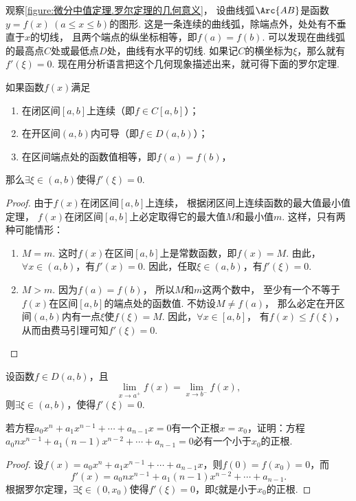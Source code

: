 观察\cref{figure:微分中值定理.罗尔定理的几何意义}，
设曲线弧\(\Arc{AB}\)是函数\(y=f(x)\ (a\leq x\leq b)\)的图形.
这是一条连续的曲线弧，除端点外，处处有不垂直于\(x\)的切线，
且两个端点的纵坐标相等，即\(f(a)=f(b)\).
可以发现在曲线弧的最高点\(C\)处或最低点\(D\)处，曲线有水平的切线.
如果记\(C\)的横坐标为\(\xi\)，那么就有\(f'(\xi)=0\).
现在用分析语言把这个几何现象描述出来，就可得下面的罗尔定理.

\begin{theorem}[罗尔定理]\label{theorem:微分中值定理.罗尔定理}
如果函数\(f(x)\)满足
\begin{enumerate}
	\item 在闭区间\([a,b]\)上连续（即\(f \in C[a,b]\)）；
	\item 在开区间\((a,b)\)内可导（即\(f \in D(a,b)\)）；
	\item 在区间端点处的函数值相等，即\(f(a)=f(b)\)，
\end{enumerate}
那么\(\exists \xi \in (a,b)\)使得\(f'(\xi) = 0\).
\begin{proof}
由于\(f(x)\)在闭区间\([a,b]\)上连续，
根据闭区间上连续函数的最大值最小值定理，
\(f(x)\)在闭区间\([a,b]\)上必定取得它的最大值\(M\)和最小值\(m\).
这样，只有两种可能情形：
\begin{enumerate}
	\item \(M=m\).
		这时\(f(x)\)在区间\([a,b]\)上是常数函数，即\(f(x)=M\).
		由此，\(\forall x\in(a,b)\)，有\(f'(x)=0\).
		因此，任取\(\xi\in(a,b)\)，有\(f'(\xi)=0\).

	\item \(M>m\).
		因为\(f(a)=f(b)\)，
		所以\(M\)和\(m\)这两个数中，
		至少有一个不等于\(f(x)\)在区间\([a,b]\)的端点处的函数值.
		不妨设\(M \neq f(a)\)，
		那么必定在开区间\((a,b)\)内有一点\(\xi\)使\(f(\xi)=M\).
		因此，\(\forall x\in[a,b]\)，
		有\(f(x) \leq f(\xi)\)，从而由费马引理可知\(f'(\xi)=0\).
		\qedhere
\end{enumerate}
\end{proof}
\end{theorem}

\begin{corollary}
设函数\(f \in D(a,b)\)，且\[
\lim_{x \to a^+} f(x)
= \lim_{x \to b^-} f(x),
\]则\(\exists\xi\in(a,b)\)，使得\(f'(\xi) = 0\).
\end{corollary}

\begin{example}
若方程\(a_0 x^n + a_1 x^{n-1} + \dotsb + a_{n-1} x = 0\)有一个正根\(x = x_0\)，证明：方程\(a_0 n x^{n-1} + a_1 (n-1) x^{n-2} + \dotsb + a_{n-1} = 0\)必有一个小于\(x_0\)的正根.
\begin{proof}
设\(f(x) = a_0 x^n + a_1 x^{n-1} + \dotsb + a_{n-1} x\)，则\(f(0) = f(x_0) = 0\)，而\[
f'(x) = a_0 n x^{n-1} + a_1 (n-1) x^{n-2} + \dotsb + a_{n-1}.
\]根据罗尔定理，\(\exists \xi \in (0,x_0)\)使得\(f'(\xi) = 0\)，即\(\xi\)就是小于\(x_0\)的正根.
\end{proof}
\end{example}

